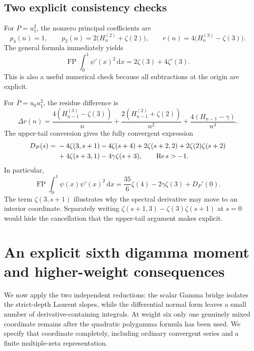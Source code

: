 \documentclass[11pt,a4paper]{article}
\numberwithin{equation}{section}
\theoremstyle{definition}
\theoremstyle{remark}
\DeclareMathOperator{\FP}{FP}
\newcommand{\re}{\operatorname{Re}}
\newcommand{\dd}{\,\mathrm d}
\begin{document}
\subsection{Two explicit consistency checks}

For $P=u_1^2$, the nonzero principal coefficients are
\[
 p_4(n)=1,\qquad p_2(n)=2\bigl(H_n^{(2)}+\zeta(2)\bigr),\qquad
 r(n)=4\bigl(H_n^{(3)}-\zeta(3)\bigr).
\]
The general formula immediately yields
\begin{equation}\label{spectral:trigammasquare}
 \FP\int_0^1\psi'(x)^2\dd x
       =2\zeta(3)+4\zeta'(3).
\end{equation}
This is also a useful numerical check because all subtractions at the
origin are explicit.

For $P=u_0u_1^2$, the residue difference is
\[
 \Delta r(n)=\frac{4(H_{n-1}^{(3)}-\zeta(3))}{n}
       +\frac{2(H_{n-1}^{(2)}+\zeta(2))}{n^2}
       +\frac{4(H_{n-1}-\gamma)}{n^3}.
\]
The upper-tail conversion gives the fully convergent expression
\begin{align}\label{spectral:exampleDP}
 D_P(s)={}&-4\zeta(3,s+1)-4\zeta(s+4)
       +2\zeta(s+2,2)+2\zeta(2)\zeta(s+2)\notag\\
       &+4\zeta(s+3,1)-4\gamma\zeta(s+3),\qquad \re s>-1.
\end{align}
In particular,
\begin{equation}\label{spectral:digamma_trigammasquare}
 \FP\int_0^1\psi(x)\psi'(x)^2\dd x
       =\frac{35}{6}\zeta(4)-2\gamma\zeta(3)+D_P'(0).
\end{equation}
The term $\zeta(3,s+1)$ illustrates why the spectral derivative may
move to an interior coordinate.  Separately writing
$\zeta(s+1,3)-\zeta(3)\zeta(s+1)$ at $s=0$ would hide the cancellation
that the upper-tail argument makes explicit.



\section[An explicit sixth digamma moment and higher-weight consequences]{An explicit sixth digamma moment\\and higher-weight consequences}
\label{sixth:sec}

We now apply the two independent reductions: the scalar Gamma bridge
isolates the strict-depth Laurent slopes, while the differential normal
form leaves a small number of derivative-containing integrals.
At weight six only one genuinely mixed coordinate remains after the
quadratic polygamma formula has been used.  We specify that coordinate
completely, including ordinary convergent series and a finite
multiple-zeta representation.
\end{document}
